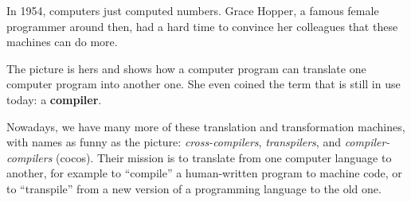 
In 1954, computers just computed numbers. Grace Hopper, a famous
female programmer around then, had a hard time to convince her
colleagues that these machines can do more.

The picture is hers and shows how a computer program can translate
one computer program into another one. She even coined the term that is still in use
today: a \textbf{compiler}.

Nowadays, we have many more of these translation and transformation
machines, with names as funny as the picture: \emph{cross-compilers},
\emph{transpilers}, and \emph{compiler-compilers} (cocos). Their mission is to
translate from one computer language to another, for example
to ``compile'' a human-written program to machine code, or to
``transpile'' from a new version of a programming language to the old one.

